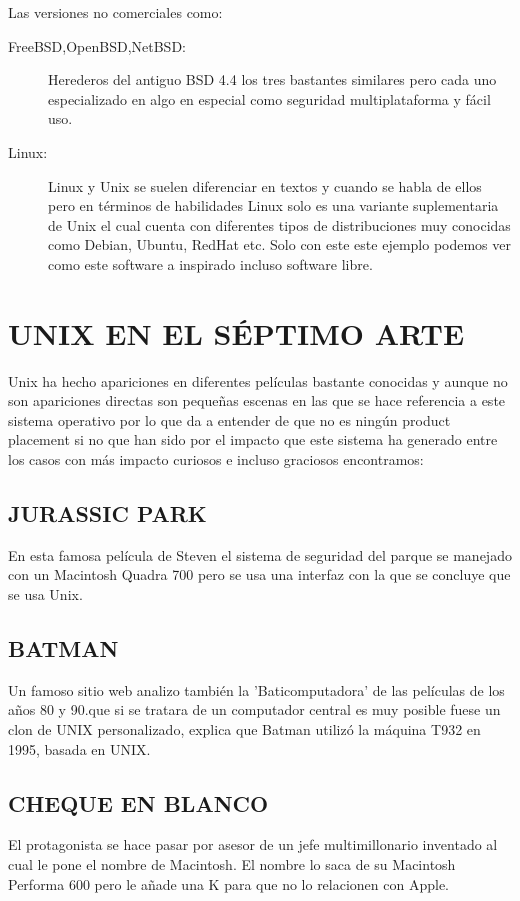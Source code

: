 \begin{description}
	\item[Las versiones no comerciales como:]
\end{description}

\begin{description}
	\item[FreeBSD,OpenBSD,NetBSD:]
		Herederos del antiguo BSD 4.4  los tres bastantes similares pero cada uno especializado en algo en especial como seguridad multiplataforma y fácil uso.
	
	\item[Linux:]
		Linux y Unix  se  suelen diferenciar en textos y cuando se habla de ellos pero en términos de habilidades Linux solo es una variante suplementaria de Unix el cual cuenta 
		con diferentes tipos de distribuciones muy conocidas como Debian, Ubuntu, RedHat etc.  Solo con este este ejemplo podemos ver como este software a inspirado incluso 
		software libre.
\end{description}


\section*{UNIX EN EL SÉPTIMO ARTE}
Unix ha hecho apariciones en diferentes películas bastante conocidas y aunque no son apariciones directas son pequeñas escenas en las que se hace referencia a este sistema 
operativo por lo que da a entender de que no es ningún product placement si no que han sido por el impacto que este sistema ha generado entre los casos con más impacto curiosos e 
incluso graciosos encontramos:

\subsection*{JURASSIC PARK}
En esta famosa película de Steven el sistema de seguridad del parque se manejado con  un Macintosh Quadra 700 pero se usa una interfaz con la que se concluye que se usa Unix.

\subsection*{BATMAN}
Un famoso sitio web analizo también la 'Baticomputadora'  de las películas de los años 80 y 90.que si se tratara de un computador central es muy posible fuese un clon de UNIX 
personalizado, explica que Batman utilizó la máquina T932 en 1995, basada en UNIX.

\subsection*{CHEQUE EN BLANCO}
El protagonista se hace pasar por asesor de un jefe multimillonario inventado al cual le pone el nombre de Macintosh. El nombre lo saca de su Macintosh Performa 600 pero le añade 
una K para que no lo relacionen con Apple.

